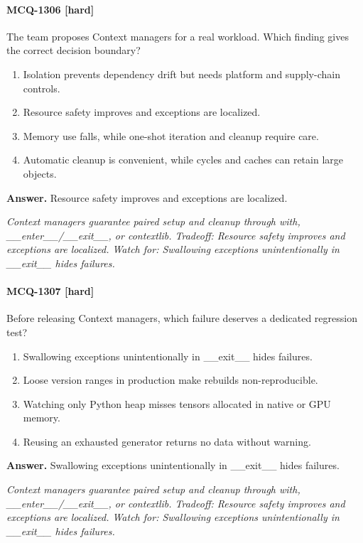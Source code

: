 \paragraph{MCQ-1306 [hard]} The team proposes Context managers for a real workload. Which finding gives the correct decision boundary?
\begin{enumerate}[label=\Alph*.]
\item Isolation prevents dependency drift but needs platform and supply-chain controls.
\item Resource safety improves and exceptions are localized.
\item Memory use falls, while one-shot iteration and cleanup require care.
\item Automatic cleanup is convenient, while cycles and caches can retain large objects.
\end{enumerate}
\noindent\textbf{Answer.} Resource safety improves and exceptions are localized.
\par\textit{Context managers guarantee paired setup and cleanup through with, \_\_enter\_\_/\_\_exit\_\_, or contextlib. Tradeoff: Resource safety improves and exceptions are localized. Watch for: Swallowing exceptions unintentionally in \_\_exit\_\_ hides failures.}
\paragraph{MCQ-1307 [hard]} Before releasing Context managers, which failure deserves a dedicated regression test?
\begin{enumerate}[label=\Alph*.]
\item Swallowing exceptions unintentionally in \_\_exit\_\_ hides failures.
\item Loose version ranges in production make rebuilds non-reproducible.
\item Watching only Python heap misses tensors allocated in native or GPU memory.
\item Reusing an exhausted generator returns no data without warning.
\end{enumerate}
\noindent\textbf{Answer.} Swallowing exceptions unintentionally in \_\_exit\_\_ hides failures.
\par\textit{Context managers guarantee paired setup and cleanup through with, \_\_enter\_\_/\_\_exit\_\_, or contextlib. Tradeoff: Resource safety improves and exceptions are localized. Watch for: Swallowing exceptions unintentionally in \_\_exit\_\_ hides failures.}
